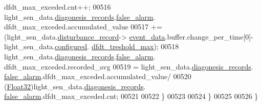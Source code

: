 \begin{DoxyCode}
      dfdt\_max\_exceded.cnt++;
00516                  light\_sen\_data.\hyperlink{a00024_a7ae905b560513ad201e58c2f63375030}{diagonesis\_records}.\hyperlink{a00017_a799f50625c0c03f9404a59287810113d}{false\_alarm}.
      dfdt\_max\_exceded.accumulated\_value
00517                  +=(light\_sen\_data.\hyperlink{a00024_ac9b38e2c1d3f1013a88d33506c754152}{disturbance\_record}->
      \hyperlink{a00028_a8c0bda69e71ef674e60da47ad0be9ab0}{event\_data}.buffer.change\_per\_time[0]-light\_sen\_data.\hyperlink{a00024_a94b2d1f6ea4ab334c74d24984dd27843}{configured}.
      \hyperlink{a00021_adf9a37828e447378b1d533185213316d}{dfdt\_treshold\_max});
00518                  light\_sen\_data.\hyperlink{a00024_a7ae905b560513ad201e58c2f63375030}{diagonesis\_records}.\hyperlink{a00017_a799f50625c0c03f9404a59287810113d}{false\_alarm}.
      dfdt\_max\_exceded.recorded\_avg
00519                  = light\_sen\_data.\hyperlink{a00024_a7ae905b560513ad201e58c2f63375030}{diagonesis\_records}.
      \hyperlink{a00017_a799f50625c0c03f9404a59287810113d}{false\_alarm}.dfdt\_max\_exceded.accumulated\_value/
00520                     (\hyperlink{a00072_a87d38f886e617ced2698fc55afa07637}{Float32})light\_sen\_data.\hyperlink{a00024_a7ae905b560513ad201e58c2f63375030}{diagonesis\_records}.
      \hyperlink{a00017_a799f50625c0c03f9404a59287810113d}{false\_alarm}.dfdt\_max\_exceded.cnt;
00521 
00522              \}
00523 
00524              \}
00525 
00526 \}
\end{DoxyCode}
